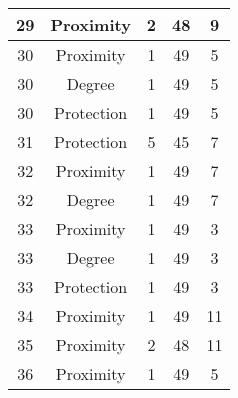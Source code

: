 \documentclass[results.tex]{subfiles}
\begin{document}
\begin{center}
\begin{tabular}{| c || c | c | c | c |}
            \hline
            29                      & Proximity                    & 2                      & 48                      & 9                    \\
            \hline
            30                      & Proximity                    & 1                      & 49                      & 5                    \\
            \hline
            30                      & Degree                       & 1                      & 49                      & 5                    \\
            \hline
            30                      & Protection                   & 1                      & 49                      & 5                    \\
            \hline
            31                      & Protection                   & 5                      & 45                      & 7                    \\
            \hline
            32                      & Proximity                    & 1                      & 49                      & 7                    \\
            \hline
            32                      & Degree                       & 1                      & 49                      & 7                    \\
            \hline
            33                      & Proximity                    & 1                      & 49                      & 3                    \\
            \hline
            33                      & Degree                       & 1                      & 49                      & 3                    \\
            \hline
            33                      & Protection                   & 1                      & 49                      & 3                    \\
            \hline
            34                      & Proximity                    & 1                      & 49                      & 11                   \\
            \hline
            35                      & Proximity                    & 2                      & 48                      & 11                   \\
            \hline
            36                      & Proximity                    & 1                      & 49                      & 5                    \\

\end{tabular}
\end{center}
\end{document}
